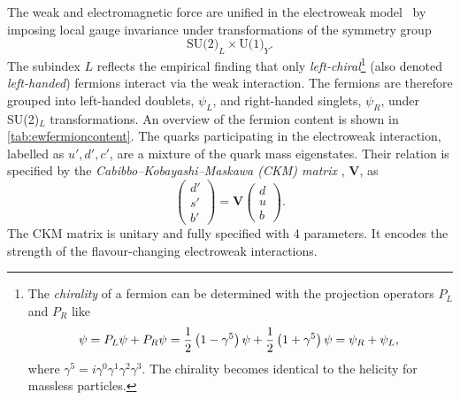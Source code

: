The weak and electromagnetic force are unified in the electroweak model~\cite{GLASHOW1961579,SALAM1964168,PhysRevLett.19.1264} by imposing local gauge invariance under transformations of the symmetry group
\begin{equation}
  \label{eq:ew-sym-group}
  \text{SU(2)}_L \times \text{U(1)}_Y.
\end{equation}
The subindex $L$ reflects the empirical finding that only \emph{left-chiral}\footnote{
  The \emph{chirality} of a fermion can be determined with the projection operators $P_L$ and $P_R$ like
  \begin{equation*}
    \psi       = P_L \psi + P_R \psi = \frac{1}{2} \left( 1 - \gamma^5 \right) \psi + \frac{1}{2} \left( 1 + \gamma^5 \right) \psi = \psi_R + \psi_L,                                \\
  \end{equation*}
  where $\gamma^5 = i\gamma^0\gamma^1\gamma^2\gamma^3$. The chirality becomes identical to the helicity for massless particles.
} (also denoted \emph{left-handed}) fermions interact via the weak interaction.
The fermions are therefore grouped into left-handed doublets, $\psi_L$, and right-handed singlets, $\psi_R$, under SU(2)$_L$ transformations. An overview of the fermion content is shown in \cref{tab:ewfermioncontent}.
The quarks participating in the electroweak interaction, labelled as $u', d', c'$, are a mixture of the quark mass eigenstates. Their relation is specified by the \emph{Cabibbo–Kobayashi–Maskawa (CKM) matrix} \cite{doi:10.1143/PTP.49.652}, $\pmb{V}$, as
\begin{equation}
  \begin{pmatrix}
   d' \\
   s' \\
   b'
 \end{pmatrix}
 = 
 \pmb{V} 
 \begin{pmatrix}
   d \\
   u \\
   b
 \end{pmatrix}.
\end{equation}
The CKM matrix is unitary and fully specified with 4 parameters. It encodes the strength of the flavour-changing electroweak interactions.

